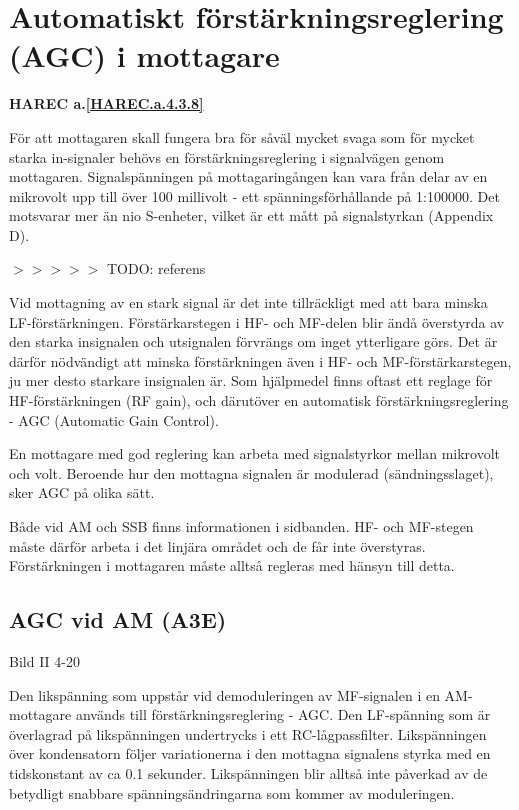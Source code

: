 \section{Automatiskt förstärkningsreglering (AGC) i mottagare}
\textbf{HAREC a.\ref{HAREC.a.4.3.8}\label{myHAREC.a.4.3.8}}

För att mottagaren skall fungera bra för såväl mycket svaga som för
mycket starka in-signaler behövs en förstärkningsreglering i
signalvägen genom mottagaren. Signalspänningen på mottagaringången kan
vara från delar av en mikrovolt upp till över 100 millivolt - ett
spänningsförhållande på 1:100000. Det motsvarar mer än nio S-enheter,
vilket är ett mått på signalstyrkan (Appendix D).

$>>>>>$ TODO: referens

Vid mottagning av en stark signal är det inte tillräckligt med att
bara minska LF-förstärkningen. Förstärkarstegen i HF- och MF-delen
blir ändå överstyrda av den starka insignalen och utsignalen förvrängs
om inget ytterligare görs. Det är därför nödvändigt att minska
förstärkningen även i HF- och MF-förstärkarstegen, ju mer desto
starkare insignalen är. Som hjälpmedel finns oftast ett reglage för
HF-förstärkningen (RF gain), och därutöver en automatisk
förstärkningsreglering - AGC (Automatic Gain Control).

En mottagare med god reglering kan arbeta med signalstyrkor mellan
mikrovolt och volt. Beroende hur den mottagna signalen är modulerad
(sändningsslaget), sker AGC på olika sätt.

Både vid AM och SSB finns informationen i sidbanden. HF- och MF-stegen
måste därför arbeta i det linjära området och de får inte
överstyras. Förstärkningen i mottagaren måste alltså regleras med
hänsyn till detta.

\subsection{AGC vid AM (A3E)}

Bild II 4-20

Den likspänning som uppstår vid demoduleringen av MF-signalen i en
AM-mottagare används till förstärkningsreglering - AGC.  Den
LF-spänning som är överlagrad på likspänningen undertrycks i ett
RC-lågpassfilter. Likspänningen över kondensatorn följer variationerna
i den mottagna signalens styrka med en tidskonstant av ca 0.1
sekunder. Likspänningen blir alltså inte påverkad av de betydligt
snabbare spänningsändringarna som kommer av moduleringen.

